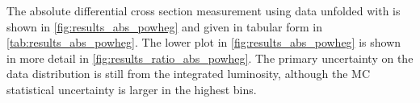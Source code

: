 


The absolute differential cross section measurement using data unfolded with
\PPsixZtwo is shown in \cref{fig:results_abs_powheg} and given in tabular form
in \cref{tab:results_abs_powheg}. The lower plot in
\cref{fig:results_abs_powheg} is shown in more detail in
\cref{fig:results_ratio_abs_powheg}. The primary uncertainty on the data
distribution is still from the integrated luminosity, although the MC
statistical uncertainty is larger in the highest \phistar bins.



